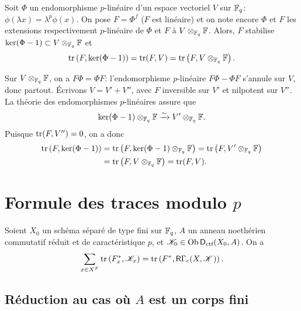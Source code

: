 \begin{lemma_}\label{III:3-8}
Soit $\Phi$ un endomorphisme $p$-linéaire d'un espace vectoriel $V$ sur 
$\mathbb{F}_q$: $\phi(\lambda x) = \lambda^p\phi(x)$. On pose $F=\Phi^f$ ($F$ est 
linéaire) et on note encore $\Phi$ et $F$ les extensions respectivement 
$p$-linéaire de $\Phi$ et $F$ à $V\otimes_{\mathbb{F}_q}\mathbb{F}$. Alors, $F$ stabilise 
$\ker(\Phi-1)\subset V\otimes_{\mathbb{F}_q}\mathbb{F}$ et 
\[
  \operatorname{tr}\left(F,\ker(\Phi-1)\right) = \operatorname{tr}(F,V) = \operatorname{tr}\left(F,V\otimes_{\mathbb{F}_q}\mathbb{F}\right) \text{.}
\]
\end{lemma_}

Sur $V\otimes_{\mathbb{F}_q}\mathbb{F}$, on a $F\Phi = \Phi F$: l'endomorphisme $p$-linéaire 
$F\Phi-\Phi F$ s'annule sur $V$, donc partout. Écrivons $V=V'+V''$, avec $F$ 
inversible sur $V'$ et nilpotent sur $V''$. La théorie des endomorphismes 
$p$-linéaires assure que 
\[
  \ker(\Phi-1)\otimes_{\mathbb{F}_q}\mathbb{F} \xrightarrow\sim V'\otimes_{\mathbb{F}_q}\mathbb{F} \text{.}
\]
Puisque $\operatorname{tr}(F,V'') = 0$, on a donc 
\begin{align*}
  \operatorname{tr}\left(F,\ker(\Phi-1)\right) 
    &= \operatorname{tr}\left(F,\ker(\Phi-1)\otimes_{\mathbb{F}_q}\mathbb{F}\right) = \operatorname{tr}\left(F,V'\otimes_{\mathbb{F}_q}\mathbb{F}\right) \\
    &= \operatorname{tr}\left(F,V\otimes_{\mathbb{F}_q}\mathbb{F}\right) = \operatorname{tr}(F,V) \text{.}
\end{align*}










\section{Formule des traces modulo \texorpdfstring{$p$}{p}}\label{III:4}





\begin{theorem_}\label{III:4-1}
Soient $X_0$ un schéma séparé de type fini sur $\mathbb{F}_q$, $A$ un anneau 
noethérien commutatif réduit et de caractéristique $p$, et 
$\mathscr{K}_0\in\operatorname{Ob}\mathsf{D}_\textnormal{ctf}(X_0,A)$. On a 
\begin{equation}\label{III:eq:4-1-1}
  \sum_{x\in X^F} \operatorname{tr}\left(F_x^*,\mathscr{K}_x\right) = \operatorname{tr}\left(F^*,\mathsf{R}\Gamma_c(X,\mathscr{K})\right) \text{.}
\end{equation}
\end{theorem_}





\subsection{Réduction au cas où \texorpdfstring{$A$}{A} est un corps fini}\label{III:4-2}

